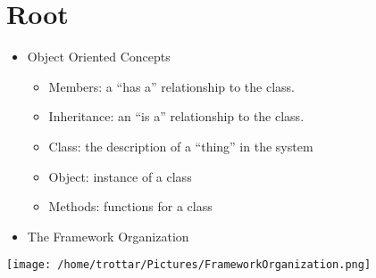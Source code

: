 \documentclass[11pt]{article}
\begin{document}
\section{Root}
\label{sec:orgb56205c}
\begin{itemize}
\item Object Oriented Concepts
\begin{itemize}
\item Members: a “has a” relationship to the class.
\item Inheritance: an “is a” relationship to the class.
\item Class: the description of a “thing” in the system
\item Object: instance of a class
\item Methods: functions for a class
\end{itemize}
\item The Framework Organization
\end{itemize}
\begin{center}
\texttt{[image: /home/trottar/Pictures/FrameworkOrganization.png]}
\end{center}
\end{document}
